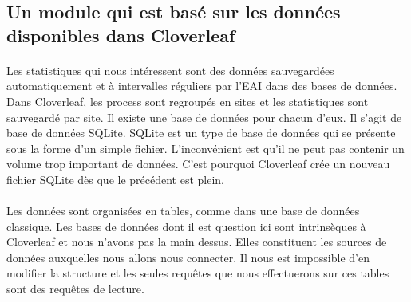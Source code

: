 		\subsection{Un module qui est basé sur les données disponibles dans
		Cloverleaf}
			\paragraph{}
			Les statistiques qui nous intéressent sont des données sauvegardées
			automatiquement et à intervalles réguliers par l'EAI
			dans des bases de données. Dans Cloverleaf, les process sont regroupés en
			sites et les statistiques sont sauvegardé par site. Il existe une base de
			données pour chacun d'eux. Il s'agit de base de données SQLite. SQLite est un
			type de base de données qui se présente sous la forme d'un simple fichier.
			L'inconvénient est qu'il ne peut pas contenir un volume trop important de
			données. C'est pourquoi Cloverleaf crée un nouveau fichier SQLite dès que le
			précédent est plein.
			
			\paragraph{}
			Les données sont organisées en tables, comme dans une base de données
			classique. Les bases de données dont il est question ici sont intrinsèques
			à Cloverleaf et nous n'avons pas la main dessus. Elles constituent les
			sources de données auxquelles nous allons nous connecter. Il nous est
			impossible d'en modifier la structure et les seules requêtes que nous
			effectuerons sur ces tables sont des requêtes de lecture.
			

